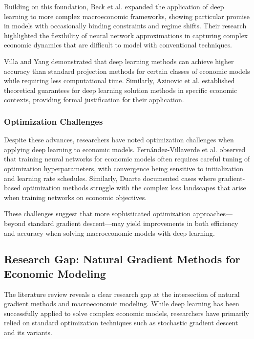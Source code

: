 \documentclass[a4paper]{article}
\begin{document}
Building on this foundation, Beck et al. \cite{beck2024deep} expanded the application of deep learning to more complex macroeconomic frameworks, showing particular promise in models with occasionally binding constraints and regime shifts. Their research highlighted the flexibility of neural network approximations in capturing complex economic dynamics that are difficult to model with conventional techniques.

Villa and Yang \cite{villa2021solution} demonstrated that deep learning methods can achieve higher accuracy than standard projection methods for certain classes of economic models while requiring less computational time. Similarly, Azinovic et al. \cite{azinovic2022deep} established theoretical guarantees for deep learning solution methods in specific economic contexts, providing formal justification for their application.

\subsubsection{Optimization Challenges}
Despite these advances, researchers have noted optimization challenges when applying deep learning to economic models. Fernández-Villaverde et al. \cite{fernandez2020neural} observed that training neural networks for economic models often requires careful tuning of optimization hyperparameters, with convergence being sensitive to initialization and learning rate schedules. Similarly, Duarte \cite{duarte2018machine} documented cases where gradient-based optimization methods struggle with the complex loss landscapes that arise when training networks on economic objectives.

These challenges suggest that more sophisticated optimization approaches—beyond standard gradient descent—may yield improvements in both efficiency and accuracy when solving macroeconomic models with deep learning.

\subsection{Research Gap: Natural Gradient Methods for Economic Modeling}

The literature review reveals a clear research gap at the intersection of natural gradient methods and macroeconomic modeling. While deep learning has been successfully applied to solve complex economic models, researchers have primarily relied on standard optimization techniques such as stochastic gradient descent and its variants.
\end{document}
